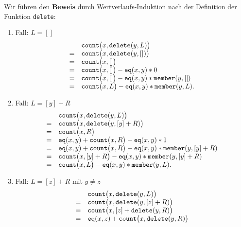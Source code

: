 \noindent
Wir f\"uhren den \textbf{Beweis} durch Wertverlaufs-Induktion nach der Definition der Funktion \texttt{delete}:
\begin{enumerate}
\item Fall: $L = []$
      \[
      \begin{array}[b]{cll}
         & \mathtt{count}\bigl(x, \mathtt{delete}(y,L) \bigr) \\
       = & \mathtt{count}\bigl(x, \mathtt{delete}(y,[]) \bigr) \\
       = & \mathtt{count}\bigl(x, [] \bigr) \\
       = & \mathtt{count}\bigl(x, [] \bigr) - \mathtt{eq}(x,y) * 0\\
       = & \mathtt{count}\bigl(x, [] \bigr) - \mathtt{eq}(x,y) * \mathtt{member}(y,[])\\
       = & \mathtt{count}\bigl(x,  L \bigr) - \mathtt{eq}(x,y) * \mathtt{member}(y,L).
      \end{array}
      \]
\item Fall: $L = [y] + R$
      \[
      \begin{array}[b]{cll}
         & \mathtt{count}\bigl(x, \mathtt{delete}(y,L) \bigr) \\
       = & \mathtt{count}\bigl(x, \mathtt{delete}(y,[y] + R) \bigr) \\
       = & \mathtt{count}\bigl(x, R \bigr) \\
       = & \mathtt{eq}(x,y) + \mathtt{count}\bigl(x, R \bigr) - \mathtt{eq}(x,y) * 1 \\
       = & \mathtt{eq}(x,y) + \mathtt{count}\bigl(x, R \bigr) - \mathtt{eq}(x,y) * \mathtt{member}(y, [y] + R) \\
       = & \mathtt{count}\bigl(x, [y] + R \bigr) - \mathtt{eq}(x,y) * \mathtt{member}(y, [y] + R) \\
       = & \mathtt{count}\bigl(x,  L \bigr) - \mathtt{eq}(x,y) * \mathtt{member}(y,L).
      \end{array}
      \]
\item Fall: $L = [z] + R$ mit $y \not= z$
      \[
      \begin{array}[b]{cll}
         & \mathtt{count}\bigl(x, \mathtt{delete}(y,L) \bigr) \\
       = & \mathtt{count}\bigl(x, \mathtt{delete}(y,[z] + R) \bigr) \\
       = & \mathtt{count}\bigl(x, [z] + \mathtt{delete}(y, R) \bigr) \\
       = & \mathtt{eq}(x,z) + \mathtt{count}\bigl(x, \mathtt{delete}(y, R) \bigr) \\

\end{array}\]
\end{enumerate}
